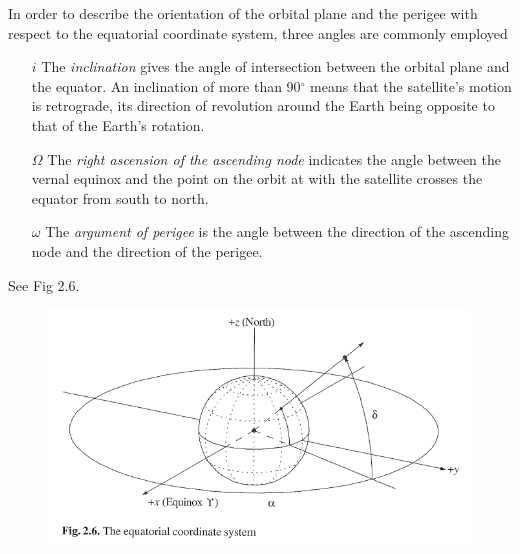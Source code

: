 \documentclass[11pt]{article}
\begin{document}
In order to describe the orientation of the orbital plane and the
perigee with respect to the equatorial coordinate system, three angles
are commonly employed
\begin{itemize}
\item[$i$] The {\em inclination} gives the angle of intersection
  between the orbital plane and the equator. An inclination of more
  than 90$^{\circ}$ means that the satellite's motion is retrograde,
  its direction of revolution around the Earth being opposite to that
  of the Earth's rotation.
\item[$\Omega$] The {\em right ascension of the ascending node}
  indicates the angle between the vernal equinox and the
  point on the orbit at with the satellite crosses the equator from
  south to north.
\item[$\omega$] The {\em argument of perigee} is the angle between the
  direction of the ascending node and the direction of the perigee.
\end{itemize}
See Fig 2.6.

\begin{figure}
  \begin{center}
    \includegraphics{figure-2-6.pdf}
  \end{center}
\end{figure}
\end{document}
